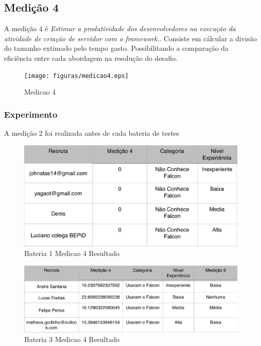 \subsection{Medição 4}

A medição 4 é \textit{Estimar a produtividade dos desenvolvedores na execução da atividade de criação de servidor com o framework.}. Consiste
em cálcular a divisão do tamanho extimado pelo tempo gasto. Possibilitando a comparação da eficiência entre cada abordagem
na resolução do desafio.

\begin{figure}[H]
  \centering
  \label{fig:indicadores}
  \texttt{[image: figuras/medicao4.eps]}
  \caption{Medicao 4}
\end{figure}

\subsubsection{Experimento}

A medição 2 foi realizada antes de cada bateria de testes


\begin{figure}[H]
  \centering
  \label{fig:indicadores}
  \includegraphics[keepaspectratio=true,scale=0.6]{figuras/Bateria1Medicao4.eps}
  \caption{Bateria 1 Medicao 4 Resultado}
\end{figure}


\begin{figure}[H]
  \centering
  \label{fig:indicadores}
  \includegraphics[keepaspectratio=true,scale=0.6]{figuras/Bateria3Medicao4.eps}
  \caption{Bateria 3 Medicao 4 Resultado}
\end{figure}




